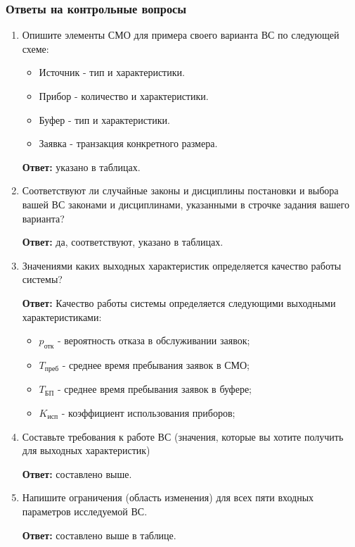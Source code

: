 \documentclass[a4paper, 14pt]{article}
\begin{document}
\subsubsection{Ответы на контрольные вопросы}

\begin{enumerate}
	\item Опишите элементы СМО для примера своего варианта ВС по следующей схеме:
	      \begin{itemize}
		      \item Источник - тип и характеристики.
		      \item Прибор - количество и характеристики.
		      \item Буфер - тип и характеристики.
		      \item Заявка - транзакция конкретного размера.
	      \end{itemize}

	      \textbf{Ответ:} указано в таблицах.
	\item Соответствуют ли случайные законы и дисциплины постановки и выбора вашей ВС законами и дисциплинами, указанными в строчке задания вашего варианта?

	      \textbf{Ответ:} да, соответствуют, указано в таблицах.
	\item Значениями каких выходных характеристик определяется качество работы системы?

	      \textbf{Ответ:}
	      Качество работы системы определяется следующими выходными характеристиками:

	      \begin{itemize}
		      \item $p_\text{отк}$ - вероятность отказа в обслуживании заявок;
		      \item $T_\text{преб}$ - среднее время пребывания заявок в СМО;
		      \item $T_\text{БП}$ - среднее время пребывания заявок в буфере;
		      \item $K_\text{исп}$ - коэффициент использования приборов;
	      \end{itemize}
	\item Составьте требования к работе ВС (значения, которые вы хотите получить для выходных характеристик)

	      \textbf{Ответ:} составлено выше.
	\item Напишите ограничения (область изменения) для всех пяти входных параметров исследуемой ВС.

	      \textbf{Ответ:} составлено выше в таблице.
\end{enumerate}
\end{document}
